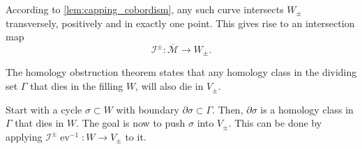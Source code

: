 According to \cref*{lem:capping_cobordism}, any such curve intersects $W_\pm$ transversely, positively and in exactly one point.
This gives rise to an intersection map
\[
    \mathcal{I}^\pm\colon \overline{\mathcal{M}} \to W_\pm.
\]

The homology obstruction theorem states that any homology class in the dividing set $\Gamma$ that dies in the filling $W$,
will also die in $V_\pm$.

Start with a cycle $\sigma \subset W$ with boundary $\partial \sigma \subset \Gamma$.
Then, $\partial \sigma$ is a homology class in $\Gamma$ that dies in $W$.
The goal is now to push $\sigma$ into $V_\pm$.
This can be done by applying $\mathcal{I}^\pm\operatorname{ev}^{-1}\colon W \to V_\pm$ to it.